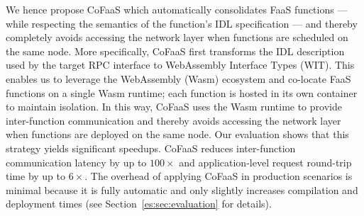 We hence propose CoFaaS which automatically consolidates FaaS functions --- while respecting the semantics of the function's IDL specification --- and thereby completely avoids accessing the network layer when functions are scheduled on the same node.
More specifically, CoFaaS first transforms the IDL description used by the target RPC interface to WebAssembly Interface Types (WIT). This enables us to leverage the WebAssembly (Wasm) ecosystem and co-locate FaaS functions on a single Wasm runtime; each function is hosted in its own container to maintain isolation. %
In this way, CoFaaS uses the Wasm runtime to provide inter-function communication and thereby avoids accessing the network layer when functions are deployed on the same node. Our evaluation shows that this strategy yields significant speedups. CoFaaS reduces inter-function communication latency by up to $100\times$ and application-level request round-trip time by up to $6\times$. The overhead of applying CoFaaS in production scenarios is minimal because it is fully automatic and only slightly increases compilation and deployment times (see Section~\ref{es:sec:evaluation} for details).



